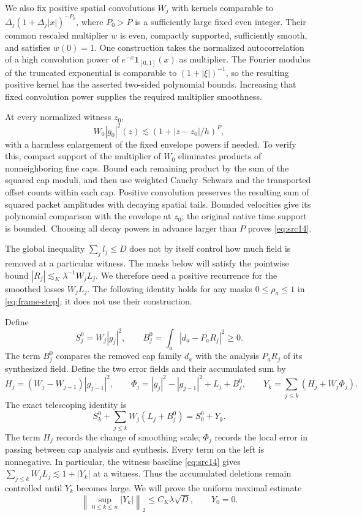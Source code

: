 We also fix positive spatial convolutions $W_j$ with kernels comparable
to
$\Delta_j(1+\Delta_j|x|)^{-P_0}$, where $P_0>P$ is a sufficiently
large fixed even integer.  Their common rescaled multiplier $w$ is
even, compactly supported, sufficiently smooth, and satisfies $w(0)=1$.
One construction takes the normalized autocorrelation of a high
convolution power of $e^{-x}\mathbf1_{[0,1]}(x)$ as multiplier.
The Fourier modulus of the truncated exponential is comparable to
$(1+|\xi|)^{-1}$, so the resulting positive kernel has the asserted
two-sided polynomial bounds.  Increasing that fixed convolution power
supplies the required multiplier smoothness.

At every normalized witness $z_0$,
\begin{equation}\label{eq:src14}
 W_0|g_0|^2(z)\lesssim(1+|z-z_0|/h)^P,
\end{equation}
with a harmless enlargement of the fixed envelope powers if needed.
To verify this, compact support of the multiplier of $W_0$ eliminates
products of nonneighboring fine caps.  Bound each remaining product
by the sum of the squared cap moduli, and then use weighted
Cauchy--Schwarz and the transported offset counts within each cap.
Positive convolution preserves the resulting sum of squared packet
amplitudes with decaying spatial tails.  Bounded velocities give its
polynomial comparison with the envelope at $z_0$; the original native
time support is bounded.  Choosing all decay powers in advance larger
than $P$ proves \eqref{eq:src14}.

The global inequality $\sum_jl_j\leq D$ does not by itself control
how much field is removed at a particular witness.  The masks below will
satisfy the pointwise bound $|R_j|\lesssim_K\lambda^{-1}W_jL_j$.
We therefore need a positive recurrence for the smoothed losses $W_jL_j$.
The following identity holds for any masks $0\leq\rho_a\leq1$ in
\eqref{eq:frame-step}; it does not use their construction.

Define
\[
 S_j^0=W_j|g_j|^2,\qquad
 B_j^0=\int_a|d_a-P_aR_j|^2\geq0.
\]
The term $B_j^0$ compares the removed cap family $d_a$ with the
analysis $P_aR_j$ of its synthesized field.  Define the two error fields
and their accumulated sum by
\[
 H_j=(W_j-W_{j-1})|g_{j-1}|^2,\qquad
 \Phi_j=|g_j|^2-|g_{j-1}|^2+L_j+B_j^0,
 \qquad Y_k=\sum_{j\leq k}(H_j+W_j\Phi_j).
\]
The exact telescoping identity is
\begin{equation}\label{eq:frame-recurrence}
 S_k^0+\sum_{j\leq k}W_j(L_j+B_j^0)=S_0^0+Y_k.
\end{equation}
The term $H_j$ records the change of smoothing scale; $\Phi_j$ records
the local error in passing between cap analysis and synthesis.
Every term on the left is nonnegative.  In particular, the witness
baseline \eqref{eq:src14} gives
$\sum_{j\leq k}W_jL_j\lesssim1+|Y_k|$ at a witness.
Thus the accumulated deletions remain controlled until $Y_k$ becomes
large.  We will prove the uniform maximal estimate
\begin{equation}\label{eq:src19}
 \left\|\sup_{0\leq k\leq n}|Y_k|\right\|_2
 \leq C_K\lambda\sqrt D,
 \qquad Y_0=0.
\end{equation}

